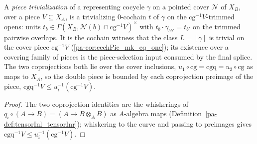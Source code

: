 \begin{definition}
  \label{pa-def:pieceTrivialization}
  \leanok

  A \emph{piece trivialization} of a representing cocycle \(\gamma\) on a pointed cover \(\mathcal N\)
  of \(X_B\), over a piece \(V \subseteq X_A\), is a trivializing \(0\)-cochain \(t\) of \(\gamma\)
  on the \(\mathrm{cg}^{-1}V\)-trimmed opens: units \(t_b \in \Gamma(X_B, \mathcal N(b) \cap
  \mathrm{cg}^{-1}V)^{\times}\) with \(t_b \cdot \gamma_{b b'} = t_{b'}\) on the trimmed pairwise
  overlaps. It is the cochain witness that the class \(L = [\gamma]\) is trivial on the cover piece
  \(\mathrm{cg}^{-1}V\) (\ref{pa-cor:cechPic_mk_eq_one}); its existence over a covering family of pieces
  is the piece-selection input consumed by the final splice. The two coprojections both lie over the
  cover inclusions, \(u_1 \circ \mathrm{cg} = \mathrm{cgq} = u_2 \circ \mathrm{cg}\) as maps to
  \(X_A\), so the double piece is bounded by each coprojection preimage of the piece,
  \(\mathrm{cgq}^{-1}V \le u_i^{-1}(\mathrm{cg}^{-1}V)\).
\end{definition}
\begin{proof}
  \leanok
  The two coprojection identities are the whiskerings of \(q_i \circ (A \to B) = (A \to B \otimes_A
  B)\) as \(A\)-algebra maps (Definition~\ref{pa-def:tensorInl_tensorInr}); whiskering to the curve and
  passing to preimages gives \(\mathrm{cgq}^{-1}V \le u_i^{-1}(\mathrm{cg}^{-1}V)\).
\end{proof}

